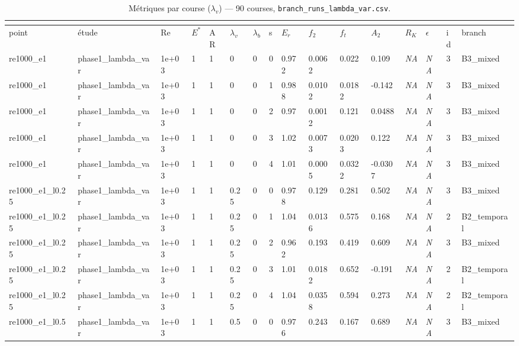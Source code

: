 \documentclass[11pt,a4paper]{article}
\begin{document}
\begin{landscape}
\begingroup\tiny
    \setlength{\tabcolsep}{1.2pt}
    \begin{longtable}{*{16}{l}}
    \caption{Métriques par course ($\lambda_v$) --- 90 courses, \texttt{branch\_runs\_lambda\_var.csv}.}\\
    \label{tab:lv_runs}\\
    \toprule
    point & étude & Re & $E^*$ & AR & $\lambda_v$ & $\lambda_b$ & s & $E_r$ & $f_2$ & $f_t$ & $A_2$ & $R_K$ & $\epsilon$ & id & branch \\
    \midrule
    \endhead
    \bottomrule
    \endlastfoot
    re1000\_e1 & phase1\_lambda\_var & 1e+03 & 1 & 1 & 0 & 0 & 0 & 0.972 & 0.0062 & 0.022 & 0.109 & \textit{NA} & \textit{NA} & 3 & B3\_mixed \\
    re1000\_e1 & phase1\_lambda\_var & 1e+03 & 1 & 1 & 0 & 0 & 1 & 0.988 & 0.0102 & 0.0182 & -0.142 & \textit{NA} & \textit{NA} & 3 & B3\_mixed \\
    re1000\_e1 & phase1\_lambda\_var & 1e+03 & 1 & 1 & 0 & 0 & 2 & 0.97 & 0.0012 & 0.121 & 0.0488 & \textit{NA} & \textit{NA} & 3 & B3\_mixed \\
    re1000\_e1 & phase1\_lambda\_var & 1e+03 & 1 & 1 & 0 & 0 & 3 & 1.02 & 0.0073 & 0.0203 & 0.122 & \textit{NA} & \textit{NA} & 3 & B3\_mixed \\
    re1000\_e1 & phase1\_lambda\_var & 1e+03 & 1 & 1 & 0 & 0 & 4 & 1.01 & 0.0005 & 0.0322 & -0.0307 & \textit{NA} & \textit{NA} & 3 & B3\_mixed \\
    re1000\_e1\_l0.25 & phase1\_lambda\_var & 1e+03 & 1 & 1 & 0.25 & 0 & 0 & 0.978 & 0.129 & 0.281 & 0.502 & \textit{NA} & \textit{NA} & 3 & B3\_mixed \\
    re1000\_e1\_l0.25 & phase1\_lambda\_var & 1e+03 & 1 & 1 & 0.25 & 0 & 1 & 1.04 & 0.0136 & 0.575 & 0.168 & \textit{NA} & \textit{NA} & 2 & B2\_temporal \\
    re1000\_e1\_l0.25 & phase1\_lambda\_var & 1e+03 & 1 & 1 & 0.25 & 0 & 2 & 0.962 & 0.193 & 0.419 & 0.609 & \textit{NA} & \textit{NA} & 3 & B3\_mixed \\
    re1000\_e1\_l0.25 & phase1\_lambda\_var & 1e+03 & 1 & 1 & 0.25 & 0 & 3 & 1.01 & 0.0182 & 0.652 & -0.191 & \textit{NA} & \textit{NA} & 2 & B2\_temporal \\
    re1000\_e1\_l0.25 & phase1\_lambda\_var & 1e+03 & 1 & 1 & 0.25 & 0 & 4 & 1.04 & 0.0358 & 0.594 & 0.273 & \textit{NA} & \textit{NA} & 2 & B2\_temporal \\
    re1000\_e1\_l0.5 & phase1\_lambda\_var & 1e+03 & 1 & 1 & 0.5 & 0 & 0 & 0.976 & 0.243 & 0.167 & 0.689 & \textit{NA} & \textit{NA} & 3 & B3\_mixed \\

\end{longtable}
\end{landscape}
\end{document}
